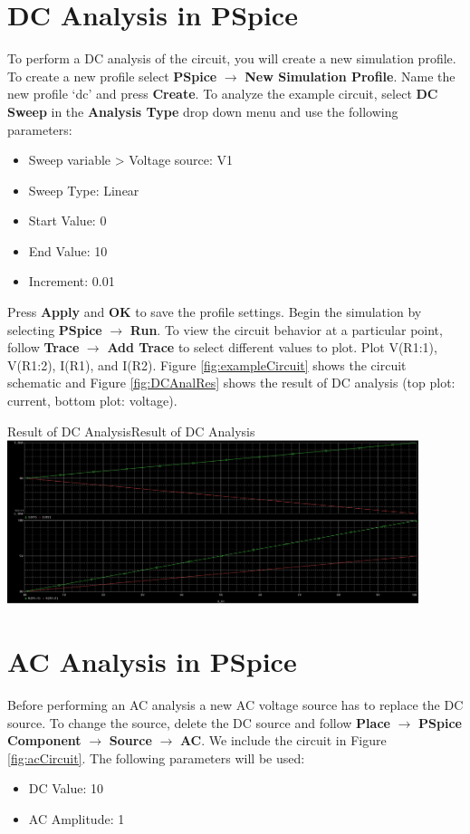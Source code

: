 \documentclass[12pt]{../manual}
\begin{document}
\section{DC Analysis in PSpice}
To perform a DC analysis of the circuit, you will create a new simulation profile. To create a new profile select \textbf{PSpice} $\to$ \textbf{New Simulation Profile}. Name the new profile `dc' and press \textbf{Create}. To analyze the example circuit, select \textbf{DC Sweep} in the \textbf{Analysis Type} drop down menu and use the following parameters:
\begin{itemize}
\item Sweep variable > Voltage source: V1
\item Sweep Type: Linear
\item Start Value: 0
\item End Value: 10
\item Increment: 0.01
\end{itemize}
Press \textbf{Apply} and \textbf{OK} to save the profile settings. Begin the simulation by selecting \textbf{PSpice} $\to$ \textbf{Run}. To view the circuit behavior at a particular point, follow \textbf{Trace} $\to$ \textbf{Add Trace} to select different values to plot. Plot V(R1:1), V(R1:2), I(R1), and I(R2). Figure \ref{fig:exampleCircuit} shows the circuit schematic and Figure \ref{fig:DCAnalRes} shows the result of DC analysis (top plot: current, bottom plot: voltage).

\begin{myfigure}[label=fig:DCAnalRes]{Result of DC Analysis}{Result of DC Analysis}
\centering
\includegraphics[width=0.9\textwidth]{figures/ResultDCAnalysisCrop.PNG}
\end{myfigure}
%
\newpage
\section{AC Analysis in PSpice}
Before performing an AC analysis a new AC voltage source has to replace the DC source. To change the source, delete the DC source and follow \textbf{Place} $\to$ \textbf{PSpice Component} $\to$ \textbf{Source} $\to$ \textbf{AC}. We include the circuit in Figure \ref{fig:acCircuit}. The following parameters will be used: 
\begin{itemize}
\item DC Value: 10
\item AC Amplitude: 1
\end{itemize}
\end{document}

